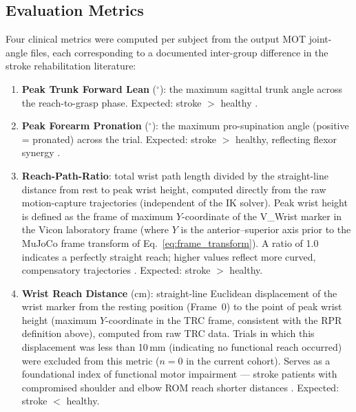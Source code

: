 \documentclass[journal,10pt,twocolumn]{IEEEtran}
\begin{document}
\subsection{Evaluation Metrics}

Four clinical metrics were computed per subject from the output MOT joint-angle
files, each corresponding to a documented inter-group difference in the stroke
rehabilitation literature:

\begin{enumerate}
  \item \textbf{Peak Trunk Forward Lean} ($^{\circ}$): the maximum sagittal
        trunk angle across the reach-to-grasp phase.
        Expected: stroke $>$ healthy \cite{cirstea2000}.

  \item \textbf{Peak Forearm Pronation} ($^{\circ}$): the maximum
        pro-supination angle (positive = pronated) across the trial.
        Expected: stroke $>$ healthy, reflecting flexor synergy \cite{dewald1995}.

  \item \textbf{Reach-Path-Ratio}: total wrist path length divided by the
        straight-line distance from rest to peak wrist height, computed
        directly from the raw motion-capture trajectories (independent of
        the IK solver). Peak wrist height is defined as the frame of maximum
        $Y$-coordinate of the V\_Wrist marker in the Vicon laboratory frame
        (where $Y$ is the anterior--superior axis prior to the MuJoCo frame
        transform of Eq.~\eqref{eq:frame_transform}).
        A ratio of 1.0 indicates a perfectly straight reach; higher values
        reflect more curved, compensatory trajectories \cite{cirstea2000}.
        Expected: stroke $>$ healthy.

  \item \textbf{Wrist Reach Distance} (cm): straight-line Euclidean
        displacement of the wrist marker from the resting position (Frame~0)
        to the point of peak wrist height (maximum $Y$-coordinate in the TRC
        frame, consistent with the RPR definition above), computed from raw
        TRC data. Trials in which this displacement was less than 10\,mm
        (indicating no functional reach occurred) were excluded from this
        metric ($n{=}0$ in the current cohort).
        Serves as a foundational index of functional motor impairment ---
        stroke patients with compromised shoulder and elbow ROM reach
        shorter distances \cite{cirstea2000}.
        Expected: stroke $<$ healthy.


\end{enumerate}
\end{document}
